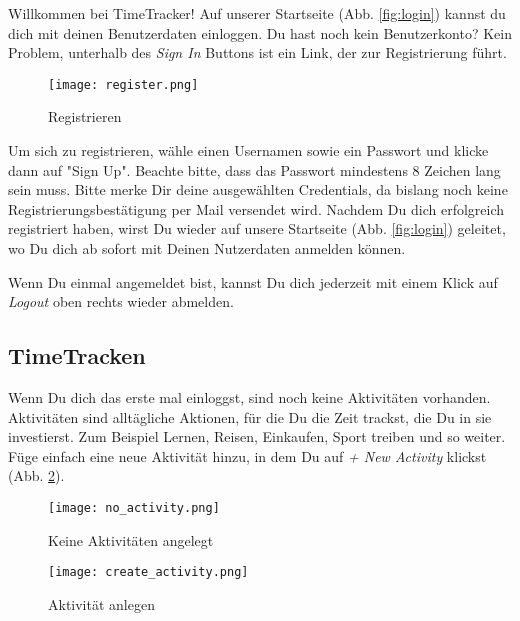 Willkommen bei TimeTracker! Auf unserer Startseite (Abb. \ref{fig:login}) kannst du dich mit deinen Benutzerdaten einloggen.  
Du hast noch kein Benutzerkonto? Kein Problem, unterhalb des \textit{Sign In} Buttons ist ein Link, der zur Registrierung führt.
 

\begin{figure}[H]
	\hspace{-1.5cm}
	\centering
	\texttt{[image: register.png]}
	\caption{Registrieren}
	\label{fig:register}
\end{figure}

Um sich zu registrieren, wähle einen Usernamen sowie ein Passwort und klicke dann auf "Sign Up". Beachte bitte, dass das Passwort mindestens 8 Zeichen lang sein muss. Bitte merke Dir deine ausgewählten Credentials, da bislang noch keine Registrierungsbestätigung per Mail versendet wird.
Nachdem Du dich erfolgreich registriert haben, wirst Du wieder auf unsere Startseite (Abb. \ref{fig:login}) geleitet, wo Du dich ab sofort mit Deinen Nutzerdaten anmelden können. 

Wenn Du einmal angemeldet bist, kannst Du dich jederzeit mit einem Klick auf \textit{Logout} oben rechts wieder abmelden.

\subsection{TimeTracken}

Wenn Du dich das erste mal einloggst, sind noch keine Aktivitäten vorhanden. 
Aktivitäten sind alltägliche Aktionen, für die Du die Zeit trackst, die Du in sie investierst. Zum Beispiel Lernen, Reisen, Einkaufen, Sport treiben und so weiter. 
Füge einfach eine neue Aktivität hinzu, in dem Du auf \textit{+ New Activity} klickst (Abb. \ref{fig:no_activity}). 

\begin{figure}[H]
	\hspace{-1.5cm}
	\centering
	\texttt{[image: no\_activity.png]}
	\caption{Keine Aktivitäten angelegt}
	\label{fig:no_activity}
\end{figure}

\begin{figure}[H]
	\hspace{-1.5cm}
	\centering
	\texttt{[image: create\_activity.png]}
	\caption{Aktivität anlegen}
	\label{fig:create_activity}
\end{figure}

